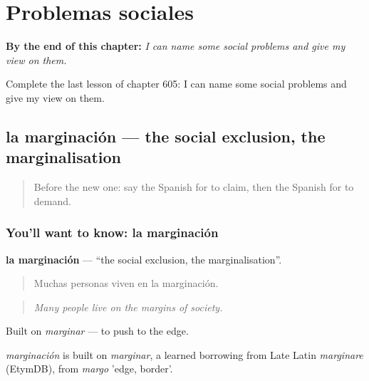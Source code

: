 
\chapter{Problemas sociales}
\label{ch:es-problemas-sociales}

\begin{chapteropening}
\textbf{By the end of this chapter:} \emph{I can name some social problems and give my view on them.}

Complete the last lesson of chapter 605: I can name some social problems and give my view on them.
\end{chapteropening}

\section[la marginación]{la marginación — the social exclusion, the marginalisation}

\label{lesson:ES-C605-marginacion}



\begin{quote}
Before the new one: say the Spanish for to claim, then the Spanish for to demand.
\end{quote}

\subsection*{You'll want to know: la marginación}
\textbf{la marginación} — \textquotedblleft{}the social exclusion, the marginalisation\textquotedblright{}.

\begin{quote}
Muchas personas viven en la marginación.
\end{quote}

\begin{quote}
\emph{Many people live on the margins of society.}
\end{quote}

Built on \emph{marginar} — to push to the edge.

\begin{cousinweb}
\emph{marginación} is built on \emph{marginar}, a learned borrowing from Late Latin \emph{marginare} (EtymDB), from \emph{margo} 'edge, border'.
\end{cousinweb}

